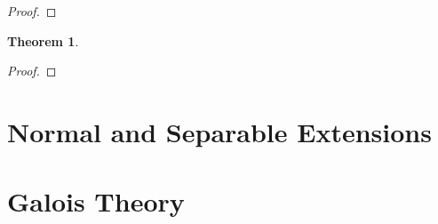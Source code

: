 \documentclass[draft]{article}
\newtheorem{thm}{Theorem}[section]
\theoremstyle{definition}
\theoremstyle{remark}
\begin{document}
            \begin{proof}
                
            \end{proof}
            
            \begin{thm}
                
            \end{thm}
            
            \begin{proof}
                
            \end{proof}
            
	\section{Normal and Separable Extensions}
	
	\section{Galois Theory}
	
\newpage

    \begin{thebibliography}{10}
    
    	\bibitem{}
    	
    \end{thebibliography}
	
\end{document}
